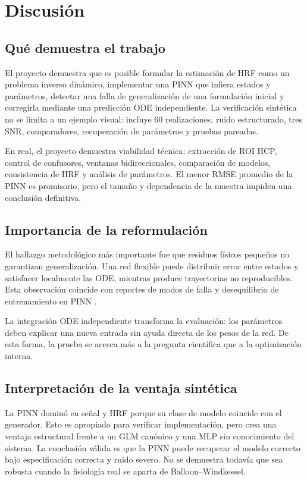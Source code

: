 \chapter{Discusión}

\section{Qué demuestra el trabajo}
El proyecto demuestra que es posible formular la estimación de HRF como un problema inverso dinámico, implementar una PINN que infiera estados y parámetros, detectar una falla de generalización de una formulación inicial y corregirla mediante una predicción ODE independiente. La verificación sintética no se limita a un ejemplo visual: incluye 60 realizaciones, ruido estructurado, tres SNR, comparadores, recuperación de parámetros y pruebas pareadas.

En real, el proyecto demuestra viabilidad técnica: extracción de ROI HCP, control de confusores, ventanas bidireccionales, comparación de modelos, consistencia de HRF y análisis de parámetros. El menor RMSE promedio de la PINN es promisorio, pero el tamaño y dependencia de la muestra impiden una conclusión definitiva.

\section{Importancia de la reformulación}
El hallazgo metodológico más importante fue que residuos físicos pequeños no garantizan generalización. Una red flexible puede distribuir error entre estados y satisfacer localmente las ODE, mientras produce trayectorias no reproducibles. Esta observación coincide con reportes de modos de falla y desequilibrio de entrenamiento en PINN \citep{Wang2021,Krishnapriyan2021,Basir2022,Wang2023}.

La integración ODE independiente transforma la evaluación: los parámetros deben explicar una nueva entrada sin ayuda directa de los pesos de la red. De esta forma, la prueba se acerca más a la pregunta científica que a la optimización interna.

\section{Interpretación de la ventaja sintética}
La PINN dominó en señal y HRF porque su clase de modelo coincide con el generador. Esto es apropiado para verificar implementación, pero crea una ventaja estructural frente a un GLM canónico y una MLP sin conocimiento del sistema. La conclusión válida es que la PINN puede recuperar el modelo correcto bajo especificación correcta y ruido severo. No se demuestra todavía que sea robusta cuando la fisiología real se aparta de Balloon--Windkessel.

